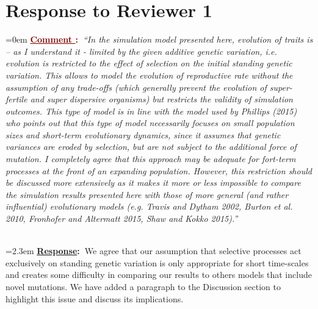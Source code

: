 \documentclass[12pt]{article}
\newcounter{cN}
\newcommand{\comment}[1]{
	\vspace{2em}
	\refstepcounter{cN} %
	\noindent \hangindent=0em \textbf{\textcolor{Maroon}{\uline{Comment \thecN}:~}}\emph{``#1''}
	}
\newcommand{\response}[1]{
	\\[0.25em]
	\hangindent=2.3em \textbf{\textcolor{NavyBlue}{\uline{Response}:~}}#1
	}
\begin{document}
\section{Response to Reviewer 1}
\vspace{-2em}

\comment{In the simulation model presented here, evolution of traits is – as I understand it - limited by the given additive genetic variation, i.e. evolution is restricted to the effect of selection on the initial standing genetic variation.
This allows to model the evolution of reproductive rate without the assumption of any trade-offs (which generally prevent the evolution of super-fertile and super dispersive organisms) but restricts the validity of simulation outcomes.
This type of model is in line with the model used by Phillips (2015) who points out that this type of model necessarily focuses on small population sizes and short-term evolutionary dynamics, since it assumes that genetic variances are eroded by selection, but are not subject to the additional force of mutation.
I completely agree that this approach may be adequate for fort-term processes at the front of an expanding population.
However, this restriction should be discussed more extensively as it makes it more or less impossible to compare the simulation results presented here with those of more general (and rather influential) evolutionary models (e.g. Travis and Dytham 2002, Burton et al. 2010, Fronhofer and Altermatt 2015, Shaw and Kokko 2015).}
\response{We agree that our assumption that selective processes act exclusively on standing genetic variation is only appropriate for short time-scales and creates some difficulty in comparing our results to others models that include novel mutations. We have added a paragraph to the Discussion section to highlight this issue and discuss its implications.}
\end{document}
